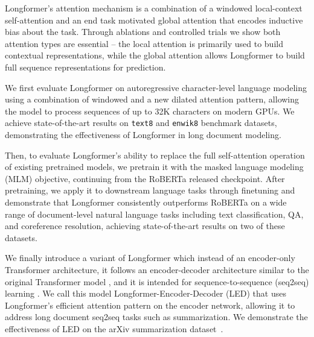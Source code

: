 \documentclass[11pt,a4paper]{article}
\newcommand{\model}{Longformer\xspace}
\begin{document}
\model's attention mechanism is a combination of a windowed local-context self-attention and an end task motivated global attention that encodes inductive bias about the task.
Through ablations and controlled trials we show both attention types are essential -- the local attention is primarily used to build contextual representations, while the global attention allows \model to build full sequence representations for prediction.





























We first evaluate \model on autoregressive character-level language modeling using a combination of windowed and a new dilated attention pattern, allowing the model to process sequences of up to 32K characters on modern GPUs. We achieve state-of-the-art results on \texttt{text8} and \texttt{enwik8} benchmark datasets, demonstrating the effectiveness of \model in long document modeling. 



Then, to evaluate \model's ability to replace the full self-attention operation of existing pretrained models, we pretrain
it with the masked language modeling (MLM) objective, continuing from the RoBERTa \cite{roberta} released checkpoint.
After pretraining, we apply it to downstream language tasks through finetuning and demonstrate that \model consistently outperforms RoBERTa on a wide range of document-level natural language tasks including text classification, QA, and coreference resolution, achieving state-of-the-art results on two of these datasets.

We finally introduce a variant of Longformer which instead of an encoder-only Transformer architecture, it follows an encoder-decoder architecture similar to the original Transformer model \cite{Vaswani2017AttentionIA}, and it is intended for sequence-to-sequence (seq2seq) learning \cite{Sutskever2014SequenceTS}. We call this model Longformer-Encoder-Decoder (LED) that uses Longformer's efficient attention pattern on the encoder network, allowing it to address long document seq2seq tasks such as summarization. We demonstrate the effectiveness of LED on the arXiv summarization dataset~\cite{arxiv2018}.
\end{document}
